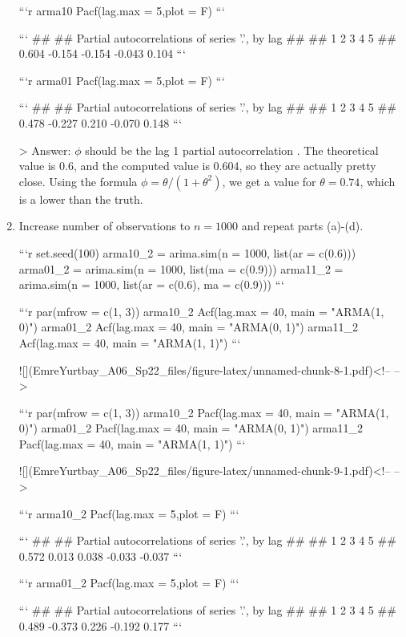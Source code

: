 \documentclass[
]{article}
\begin{document}
\begin{enumerate}[label=(\alph*)]
```r
arma10 %
  Pacf(lag.max = 5,plot = F)
```

```
## 
## Partial autocorrelations of series '.', by lag
## 
##      1      2      3      4      5 
##  0.604 -0.154 -0.154 -0.043  0.104
```


```r
arma01 %
  Pacf(lag.max = 5,plot = F)
```

```
## 
## Partial autocorrelations of series '.', by lag
## 
##      1      2      3      4      5 
##  0.478 -0.227  0.210 -0.070  0.148
```

> Answer: $\phi$ should be the lag 1 partial autocorrelation . The theoretical value 
is 0.6, and the computed value is 0.604, so they are actually pretty close. Using 
the formula $\phi = \theta / (1 + \theta^2)$, we get a value for $\theta = 0.74$, 
which is a lower than the truth. 


\item Increase number of observations to $n=1000$ and repeat parts (a)-(d).


```r
set.seed(100)
arma10_2 = arima.sim(n = 1000, list(ar = c(0.6)))
arma01_2 = arima.sim(n = 1000, list(ma = c(0.9)))
arma11_2 = arima.sim(n = 1000, list(ar = c(0.6), ma = c(0.9)))
```


```r
par(mfrow = c(1, 3))
arma10_2 %
  Acf(lag.max = 40,
      main = "ARMA(1, 0)")
arma01_2 %
  Acf(lag.max = 40,
      main = "ARMA(0, 1)")
arma11_2 %
  Acf(lag.max = 40,
      main = "ARMA(1, 1)")
```

![](EmreYurtbay_A06_Sp22_files/figure-latex/unnamed-chunk-8-1.pdf)<!-- --> 


```r
par(mfrow = c(1, 3))
arma10_2 %
  Pacf(lag.max = 40,
      main = "ARMA(1, 0)")
arma01_2 %
  Pacf(lag.max = 40,
      main = "ARMA(0, 1)")
arma11_2 %
  Pacf(lag.max = 40,
      main = "ARMA(1, 1)")
```

![](EmreYurtbay_A06_Sp22_files/figure-latex/unnamed-chunk-9-1.pdf)<!-- --> 


```r
arma10_2 %
  Pacf(lag.max = 5,plot = F)
```

```
## 
## Partial autocorrelations of series '.', by lag
## 
##      1      2      3      4      5 
##  0.572  0.013  0.038 -0.033 -0.037
```


```r
arma01_2 %
  Pacf(lag.max = 5,plot = F)
```

```
## 
## Partial autocorrelations of series '.', by lag
## 
##      1      2      3      4      5 
##  0.489 -0.373  0.226 -0.192  0.177
```



\end{enumerate}
\end{document}
